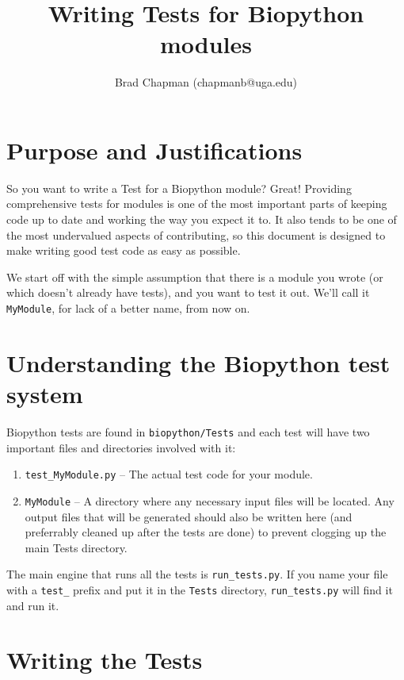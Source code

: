 \documentclass{article}
\begin{document}
\title{Writing Tests for Biopython modules}
\author{Brad Chapman (chapmanb@uga.edu)}

\maketitle
\tableofcontents

\section{Purpose and Justifications}

So you want to write a Test for a Biopython module? Great! Providing
comprehensive tests for modules is one of the most important parts of
keeping code up to date and working the way you expect it to. It also 
tends to be one of the most undervalued aspects of contributing, so this
document is designed to make writing good test code as easy as possible.


We start off with the simple assumption that there is a module you wrote
(or which doesn't already have tests), and you want to test it out.
We'll call it \verb|MyModule|, for lack of a better name, from now on.

\section{Understanding the Biopython test system}

Biopython tests are found in \verb|biopython/Tests| and each test will
have two important files and directories involved with it:

\begin{enumerate}
  \item \verb|test_MyModule.py| -- The actual test code for your module.
  \item \verb|MyModule| -- A directory where any necessary input files
    will be located. Any output files that will be generated should also
    be written here (and preferrably cleaned up after the tests are
    done) to prevent clogging up the main Tests directory.
\end{enumerate}

The main engine that runs all the tests is \verb|run_tests.py|. If you
name your file with a \verb|test_| prefix and put it in the \verb|Tests|
directory, \verb|run_tests.py| will find it and run it.

\section{Writing the Tests}
\end{document}
